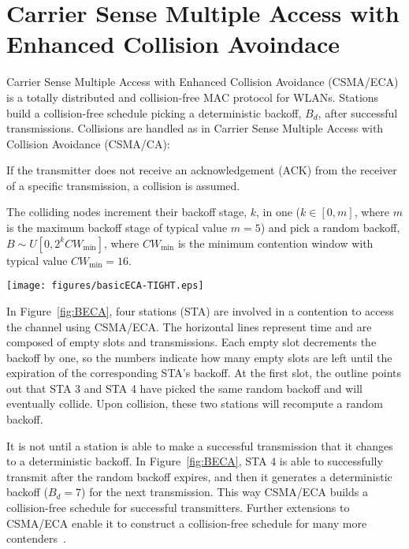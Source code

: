 \documentclass[conference]{IEEEtran}
\begin{document}
\section{Carrier Sense Multiple Access with Enhanced Collision Avoindace}

Carrier Sense Multiple Access with Enhanced Collision Avoidance (CSMA/ECA) is a totally distributed and collision-free MAC protocol for WLANs. Stations build a collision-free schedule picking a deterministic backoff, $B_{d}$, after successful transmissions. Collisions are handled as in Carrier Sense Multiple Access with Collision Avoidance (CSMA/CA):
\begin{compactitem}
	\item If the transmitter does not receive an acknowledgement (ACK) from the receiver of a specific transmission, a collision is assumed.
	\item The colliding nodes increment their backoff stage, $k$, in one ($k\in[0,m]$, where $m$ is the maximum backoff stage of typical value $m=5$) and pick a random backoff, $B\sim U[0,2^{k}CW_{\min}]$, where $CW_{\min}$ is the minimum contention window with typical value $CW_{\min}=16$.
\end{compactitem}

	\begin{figure*}[tb]
		\centering
		\texttt{[image: figures/basicECA-TIGHT.eps]}
		\caption{CSMA/ECA with four stations in saturation. ($B_{d}=7$.)}
		\label{fig:BECA}
	\end{figure*}

In Figure~\ref{fig:BECA}, four stations (STA) are involved in a contention to access the channel using CSMA/ECA. The horizontal lines represent time and are composed of empty slots and transmissions. Each empty slot decrements the backoff by one, so the numbers indicate how many empty slots are left until the expiration of the corresponding STA's backoff. At the first slot, the outline points out that STA 3 and STA 4 have picked the same random backoff and will eventually collide. Upon collision, these two stations will recompute a random backoff.

It is not until a station is able to make a successful transmission that it changes to a deterministic backoff. In Figure~\ref{fig:BECA}, STA 4 is able to successfully transmit after the random backoff expires, and then it generates a deterministic backoff ($B_{d}=7$) for the next transmission. This way CSMA/ECA builds a collision-free schedule for successful transmitters. Further extensions to CSMA/ECA enable it to construct a collision-free schedule for many more contenders~\cite{research2standards}.
\end{document}
